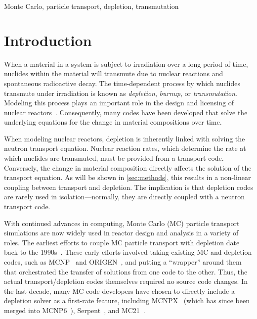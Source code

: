 \documentclass[3p,authoryear]{elsarticle}
\begin{document}
\begin{keyword}
  Monte Carlo, particle transport, depletion, transmutation
\end{keyword}

\maketitle

\section{Introduction}

When a material in a system is subject to irradiation over a long period of
time, nuclides within the material will transmute due to nuclear reactions and
spontaneous radioactive decay. The time-dependent process by which nuclides
transmute under irradiation is known as \emph{depletion}, \emph{burnup}, or
\emph{transmutation}. Modeling this process plays an important role in the
design and licensing of nuclear reactors~\citep{betzler2019ned}. Consequently,
many codes have been developed that solve the underlying equations for the
change in material compositions over time.

When modeling nuclear reactors, depletion is inherently linked with solving the
neutron transport equation. Nuclear reaction rates, which determine the rate at
which nuclides are transmuted, must be provided from a transport code.
Conversely, the change in material composition directly affects the solution of
the transport equation. As will be shown in \cref{sec:methods}, this results in
a non-linear coupling between transport and depletion. The implication is that
depletion codes are rarely used in isolation---normally, they are directly
coupled with a neutron transport code.

With continued advances in computing, Monte Carlo (MC) particle transport
simulations are now widely used in reactor design and analysis in a variety of
roles. The earliest efforts to couple MC particle transport with depletion date
back to the 1990s~\citep{moore1995inel,trellue1998lanl}. These early efforts
involved taking existing MC and depletion codes, such as
MCNP~\citep{goorley2012nt} and ORIGEN~\citep{croff1983nt}, and putting a
``wrapper'' around them that orchestrated the transfer of solutions from one
code to the other. Thus, the actual transport/depletion codes themselves
required no source code changes. In the last decade, many MC code developers
have chosen to directly include a depletion solver as a first-rate feature,
including MCNPX~\citep{waters2007aip} (which has since been merged into
MCNP6~\citep{goorley2012nt}), Serpent~\citep{leppanen2015ane}, and
MC21~\citep{griesheimer2015ane}.
\end{document}
